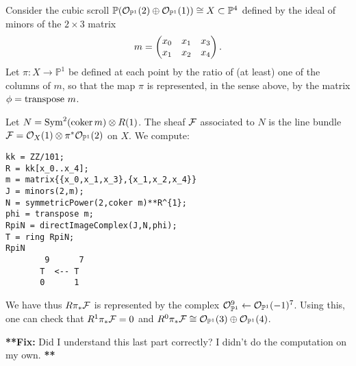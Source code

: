 \documentclass[twoside,12pt, leqno]{amsart}
\def\PP{{\mathbb P}}
\def\P{{\mathbb P}}
\def\fix#1{{\bf ***Fix:} #1 {\bf ***}}
\begin{document}
\begin{example}
Consider the cubic scroll 
$\PP(\sO_{\PP^1}(2) \oplus \sO_{\PP^1}(1))\cong X\subset \PP^4
$ 
defined by the ideal of minors of the $2\times 3$ matrix
$$
m=\begin{pmatrix}
x_0& x_1 & x_3 \cr
x_1 & x_2 & x_4 \cr
\end{pmatrix}   .
$$
Let $\pi :X \to \PP^1$ be defined at each point by the ratio of (at least) one of 
the columns of $m$, so that the map $\pi$ is represented, in the sense above,
by the matrix $\phi = {\rm transpose}\ m$. 

Let $N=\operatorname{Sym}^2({\rm{coker}\,} m)\otimes R(1)$.  The sheaf ${\mathcal F}$ associated to $N$ is the line bundle $\sF = \sO_X(1)\otimes \pi^*\sO_{\PP^1}(2)$ on $X$.  We compute:
{\small\begin{verbatim}
kk = ZZ/101;
R = kk[x_0..x_4];
m = matrix{{x_0,x_1,x_3},{x_1,x_2,x_4}}
J = minors(2,m);
N = symmetricPower(2,coker m)**R^{1};
phi = transpose m;
RpiN = directImageComplex(J,N,phi);
T = ring RpiN;
RpiN
        9      7
       T  <-- T               
       0      1
\end{verbatim}    }   
\noindent We have thus $R\pi_*{\mathcal F}$ is represented by the complex $\cO_{\PP^1}^9\gets \cO_{\PP^1}(-1)^7$.  Using this, one can check that $R^1\pi_*{\mathcal F}=0$ and $R^0\pi_*\sF\cong  \sO_{\PP^1}(3) \oplus \sO_{\PP^1}(4)$.
\end{example}
\fix{Did I understand this last part correctly?  I didn't do the computation on my own.}
%
%
\end{document}
